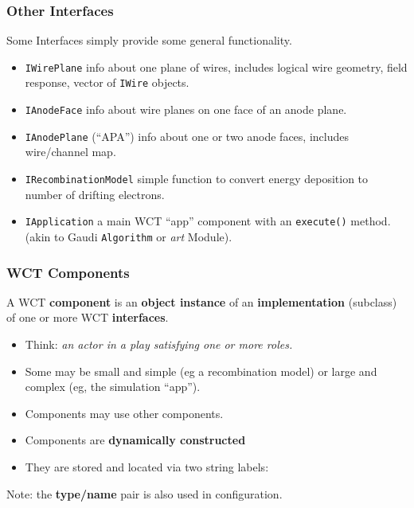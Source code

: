 \documentclass[xcolor=dvipsnames]{beamer}
\def\art{\textit{art}\xspace}
\begin{document}
\begin{frame}
  \frametitle{Other Interfaces}
  Some Interfaces simply provide some general functionality.

  \begin{itemize}
  \item \texttt{IWirePlane} info about one plane of wires, includes
    logical wire geometry, field response, vector of \texttt{IWire} objects.
  \item \texttt{IAnodeFace} info about wire planes on one face of an
    anode plane.
  \item \texttt{IAnodePlane} (``APA'') info about one or two anode faces,
    includes wire/channel map.
  \item \texttt{IRecombinationModel} simple function to convert energy
    deposition to number of drifting electrons.
  \item \texttt{IApplication} a main WCT ``app'' component with an
    \texttt{execute()} method. (akin to Gaudi \texttt{Algorithm} or
    \art Module).
  \end{itemize}
  
\end{frame}


\begin{frame}
  \frametitle{WCT Components}

  A WCT \textbf{component} is an \textbf{object instance} of an
  \textbf{implementation} (subclass) of one or more WCT
  \textbf{interfaces}.

  \begin{itemize}
  \item Think: \textit{an actor in a play satisfying one or more roles.}
  \item Some may be small and simple (eg a recombination model) or
    large and complex (eg, the simulation ``app'').
  \item Components may use other components.
  \item Components are \textbf{dynamically constructed}
  \item They are stored and located via two string labels:
  \end{itemize}
    
  \vfill
  \footnotesize Note: the \textbf{type/name} pair is also used in configuration.

\end{frame}
\end{document}
